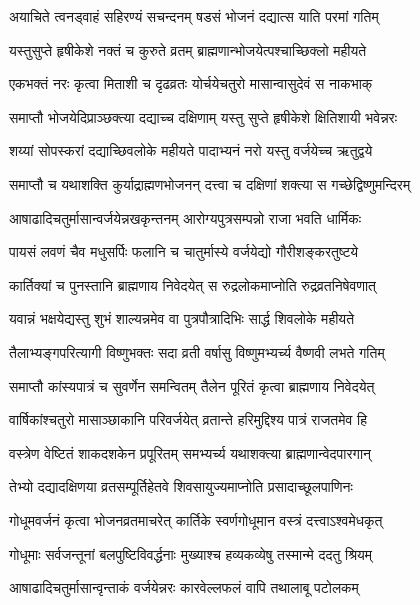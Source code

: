 \twolineshloka
{अयाचिते त्वनड्वाहं सहिरण्यं सचन्दनम्}
{षडसं भोजनं दद्यात्स याति परमां गतिम्} %

\twolineshloka
{यस्तुसुप्ते हृषीकेशे नक्तं च कुरुते व्रतम्}
{ब्राह्मणान्भोजयेत्पश्चाच्छिक्लो महीयते} %

\twolineshloka
{एकभक्तं नरः कृत्वा मिताशी च दृढव्रतः}
{योर्चयेचतुरो मासान्वासुदेवं स नाकभाक्} %

\twolineshloka
{समाप्तौ भोजयेदिप्राञ्छक्त्या दद्याच्च दक्षिणाम्}
{यस्तु सुप्ते हृषीकेशे क्षितिशायी भवेन्नरः} %

\twolineshloka
{शय्यां सोपस्करां दद्याच्छिवलोके महीयते}
{पादाभ्यनं नरो यस्तु वर्जयेच्च ऋतुद्वये} %

\twolineshloka
{समाप्तौ च यथाशक्ति कुर्याद्राह्मणभोजनन्}
{दत्त्वा च दक्षिणां शक्त्या स गच्छेद्विष्णुमन्दिरम्} %

\twolineshloka
{आषाढादिचतुर्मासान्वर्जयेन्नखकृन्तनम्}
{आरोग्यपुत्रसम्पन्नो राजा भवति धार्मिकः} %

\twolineshloka
{पायसं लवणं चैव मधुसर्पिः फलानि च}
{चातुर्मास्ये वर्जयेद्यो गौरीशङ्करतुष्टये} %

\twolineshloka
{कार्तिक्यां च पुनस्तानि ब्राह्मणाय निवेदयेत्}
{स रुद्रलोकमाप्नोति रुद्रव्रतनिषेवणात्} %

\twolineshloka
{यवान्नं भक्षयेद्यस्तु शुभं शाल्यन्नमेव वा}
{पुत्रपौत्रादिभिः सार्द्ध शिवलोके महीयते} %

\twolineshloka
{तैलाभ्यङ्गपरित्यागी विष्णुभक्तः सदा व्रती}
{वर्षासु विष्णुमभ्यर्च्य वैष्णवी लभते गतिम्} %

\twolineshloka
{समाप्तौ कांस्यपात्रं च सुवर्णेन समन्वितम्}
{तैलेन पूरितं कृत्वा ब्राह्मणाय निवेदयेत्} %

\twolineshloka
{वार्षिकांश्चतुरो मासाञ्छाकानि परिवर्जयेत्}
{व्रतान्ते हरिमुद्दिश्य पात्रं राजतमेव हि} %

\twolineshloka
{वस्त्रेण वेष्टितं शाकदशकेन प्रपूरितम्}
{समभ्यर्च्य यथाशक्त्या ब्राह्मणान्वेदपारगान्} %

\twolineshloka
{तेभ्यो दद्यादक्षिणया व्रतसम्पूर्तिहेतवे}
{शिवसायुज्यमाप्नोति प्रसादाच्छूलपाणिनः} %

\twolineshloka
{गोधूमवर्जनं कृत्वा भोजनव्रतमाचरेत्}
{कार्तिके स्वर्णगोधूमान वस्त्रं दत्त्वाऽश्वमेधकृत्} %

\twolineshloka
{गोधूमाः सर्वजन्तूनां बलपुष्टिविवर्द्धनाः}
{मुख्याश्च हव्यकव्येषु तस्मान्मे ददतु श्रियम्} %

\twolineshloka
{आषाढादिचतुर्मासान्वृन्ताकं वर्जयेन्नरः}
{कारवेल्लफलं वापि तथालाबू पटोलकम्} %


